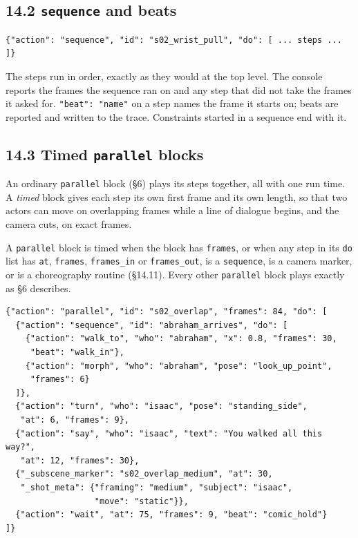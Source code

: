 \documentclass[
  12pt,
  letterpaper,
]{book}
\begin{document}
\subsection{\texorpdfstring{14.2 \texttt{sequence} and beats}{14.2 sequence and beats}}\label{sequence-and-beats}

\begin{verbatim}
{"action": "sequence", "id": "s02_wrist_pull", "do": [ ... steps ... ]}
\end{verbatim}

The steps run in order, exactly as they would at the top level. The
console reports the frames the sequence ran on and any step that did
not take the frames it asked for. \texttt{"beat": "name"} on a step
names the frame it starts on; beats are reported and written to the
trace. Constraints started in a sequence end with it.

\subsection{\texorpdfstring{14.3 Timed \texttt{parallel} blocks}{14.3 Timed parallel blocks}}\label{timed-parallel-blocks}

An ordinary \texttt{parallel} block (\S6) plays its steps together, all
with one run time. A \emph{timed} block gives each step its own first
frame and its own length, so that two actors can move on overlapping
frames while a line of dialogue begins, and the camera cuts, on exact
frames.

A \texttt{parallel} block is timed when the block has \texttt{frames},
or when any step in its \texttt{do} list has \texttt{at},
\texttt{frames}, \texttt{frames\_in} or \texttt{frames\_out}, is a
\texttt{sequence}, is a camera marker, or is a choreography routine
(\S14.11). Every other \texttt{parallel}
block plays exactly as \S6 describes.

\begin{verbatim}
{"action": "parallel", "id": "s02_overlap", "frames": 84, "do": [
  {"action": "sequence", "id": "abraham_arrives", "do": [
    {"action": "walk_to", "who": "abraham", "x": 0.8, "frames": 30,
     "beat": "walk_in"},
    {"action": "morph", "who": "abraham", "pose": "look_up_point",
     "frames": 6}
  ]},
  {"action": "turn", "who": "isaac", "pose": "standing_side",
   "at": 6, "frames": 9},
  {"action": "say", "who": "isaac", "text": "You walked all this way?",
   "at": 12, "frames": 30},
  {"_subscene_marker": "s02_overlap_medium", "at": 30,
   "_shot_meta": {"framing": "medium", "subject": "isaac",
                  "move": "static"}},
  {"action": "wait", "at": 75, "frames": 9, "beat": "comic_hold"}
]}
\end{verbatim}
\end{document}

